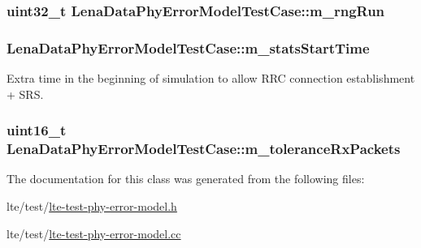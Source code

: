 \subsubsection[{\texorpdfstring{m\+\_\+rng\+Run}{m_rngRun}}]{\setlength{\rightskip}{0pt plus 5cm}uint32\+\_\+t Lena\+Data\+Phy\+Error\+Model\+Test\+Case\+::m\+\_\+rng\+Run\hspace{0.3cm}{\ttfamily [private]}}\hypertarget{classLenaDataPhyErrorModelTestCase_a6735963eff8c54a2551a0f7c0f951a8d}{}\label{classLenaDataPhyErrorModelTestCase_a6735963eff8c54a2551a0f7c0f951a8d}
\subsubsection[{\texorpdfstring{m\+\_\+stats\+Start\+Time}{m_statsStartTime}}]{ Lena\+Data\+Phy\+Error\+Model\+Test\+Case\+::m\+\_\+stats\+Start\+Time\hspace{0.3cm}{\ttfamily [private]}}\hypertarget{classLenaDataPhyErrorModelTestCase_aeff30e1e43b3bcda6fab63889dbe0996}{}\label{classLenaDataPhyErrorModelTestCase_aeff30e1e43b3bcda6fab63889dbe0996}


Extra time in the beginning of simulation to allow R\+RC connection establishment + S\+RS. 

\subsubsection[{\texorpdfstring{m\+\_\+tolerance\+Rx\+Packets}{m_toleranceRxPackets}}]{\setlength{\rightskip}{0pt plus 5cm}uint16\+\_\+t Lena\+Data\+Phy\+Error\+Model\+Test\+Case\+::m\+\_\+tolerance\+Rx\+Packets\hspace{0.3cm}{\ttfamily [private]}}\hypertarget{classLenaDataPhyErrorModelTestCase_aee9e59c87518a69c4a4e9359af2bbc96}{}\label{classLenaDataPhyErrorModelTestCase_aee9e59c87518a69c4a4e9359af2bbc96}


The documentation for this class was generated from the following files\+:\begin{DoxyCompactItemize}
\item 
lte/test/\hyperlink{lte-test-phy-error-model_8h}{lte-\/test-\/phy-\/error-\/model.\+h}\item 
lte/test/\hyperlink{lte-test-phy-error-model_8cc}{lte-\/test-\/phy-\/error-\/model.\+cc}\end{DoxyCompactItemize}
